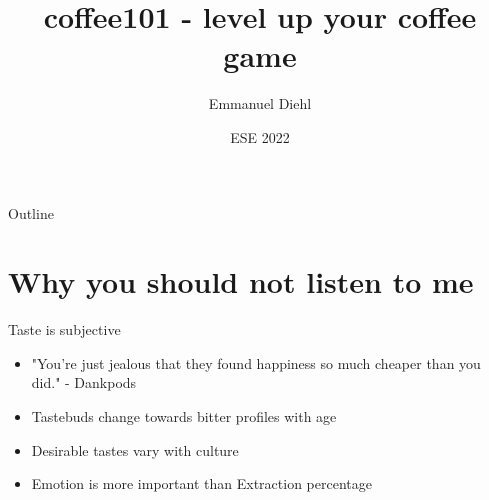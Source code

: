 \documentclass[10pt,graphics,aspectratio=169,table]{beamer}
\title{coffee101 - level up your coffee game}
\author{Emmanuel Diehl}
\date{ESE 2022}
\institute{NERD101 - ESE - ifsr - TU Dresden}
\begin{document}
\maketitle

\begin{frame}{Outline}
    \tableofcontents
\end{frame}

\section{Why you should not listen to me}

\begin{frame}{Taste is subjective}
\begin{itemize}
    \item "You're just jealous that they found happiness so much cheaper than you did." - Dankpods
    \item Tastebuds change towards bitter profiles with age 
    \item Desirable tastes vary with culture
    \item Emotion is more important than Extraction percentage
\end{itemize}


\centering
\end{frame}
\end{document}
